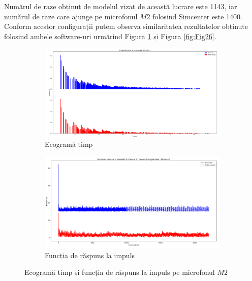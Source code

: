 Numărul de raze obținut de modelul vizat de această lucrare este 1143, iar numărul de raze care ajunge pe microfonul $M2$ folosind Simcenter este 1400. Conform acestor configurații putem observa similaritatea rezultatelor obținute folosind ambele software-uri urmărind Figura \ref{fig:Fig25} și Figura \ref{fig:Fig26}.

\begin{figure}[!htb]%
	\begin{subfigure}[b]{.48\textwidth}
		\centering
		\includegraphics[width=1\linewidth]{imagini/eco_2.png} 
		\caption{Ecogramă timp }
	\end{subfigure}
	\hfill
	\begin{subfigure}[b]{.48\textwidth}
		\centering
		\includegraphics[width=1\linewidth]{imagini/ir_2.png}
		\caption{Funcția de răspuns la impuls}
	\end{subfigure}
	
	\caption{Ecogramă timp și funcția de răspuns la impuls pe microfonul $M2$ }
	\label{fig:Fig25}	
\end{figure}

